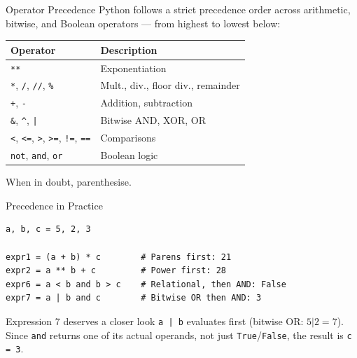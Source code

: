 \documentclass[9pt,aspectratio=169,xcolor=table]{beamer}
\newcommand{\striped}{\rowcolors{1}{white}{stripe}}
\begin{document}
\begin{frame}{Operator Precedence}
    \leavevmode
    \small
    Python follows a strict precedence order across arithmetic, bitwise,
    and Boolean operators --- \alert{from highest to lowest} below:

    \vspace{2mm}
    \striped
    \begin{center}
    \begin{tabular}{p{4.0cm}p{6.5cm}}
        \toprule
        \textbf{Operator} & \textbf{Description} \\
        \midrule
        \texttt{**} & Exponentiation \\
        \texttt{*}, \texttt{/}, \texttt{//}, \texttt{\%} & Mult., div., floor div., remainder \\
        \texttt{+}, \texttt{-} & Addition, subtraction \\
        \texttt{\&}, \texttt{\^{}}, \texttt{|} & Bitwise AND, XOR, OR \\
        \texttt{<}, \texttt{<=}, \texttt{>}, \texttt{>=}, \texttt{!=}, \texttt{==} & Comparisons \\
        \texttt{not}, \texttt{and}, \texttt{or} & Boolean logic \\
        \bottomrule
    \end{tabular}
    \end{center}

    \vspace{2mm}
    {\small \alert{When in doubt, parenthesise.}}
\end{frame}

\begin{frame}[fragile]{Precedence in Practice}
    \leavevmode
\begin{lstlisting}
a, b, c = 5, 2, 3

expr1 = (a + b) * c        # Parens first: 21
expr2 = a ** b + c         # Power first: 28
expr6 = a < b and b > c    # Relational, then AND: False
expr7 = a | b and c        # Bitwise OR then AND: 3
\end{lstlisting}

    \vspace{2mm}
    \begin{alertblock}{Expression 7 deserves a closer look}
        \texttt{a | b} evaluates first (bitwise OR: $5|2=7$). Since
        \texttt{and} returns one of its \alert{actual operands}, not
        just \texttt{True}/\texttt{False}, the result is \texttt{c = 3}.
    \end{alertblock}
\end{frame}
\end{document}

